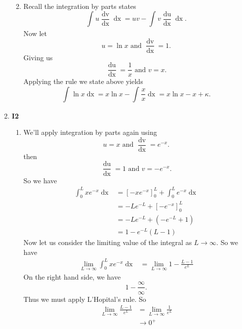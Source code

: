 \documentclass[12pt,oneside]{book}
\begin{document}
\begin{enumerate}
\begin{enumerate}
\begin{align*}
            \end{align*}
            \item Recall the integration by parts states \[
                \int_{}^{} u \frac{\mathop{\mathrm{d}v}}{\mathop{\mathrm{d}x}} \mathop{\mathrm{d}x} = uv - \int_{}^{} v \frac{\mathop{\mathrm{d}u}}{\mathop{\mathrm{d}x}} \mathop{\mathrm{d}x}  
            .\] Now let \[
                u = \ln x \text{ and } \frac{\mathop{\mathrm{d}v}}{\mathop{\mathrm{d}x}} = 1
            .\] Giving us \[
                \frac{\mathop{\mathrm{d}u}}{\mathop{\mathrm{d}x}} = \frac{1}{x} \text{ and } v = x
            .\] Applying the rule we state above yields \[
                \int_{}^{} \ln x \mathop{\mathrm{d}x} = x \ln x - \int_{}^{} \frac{x}{x} \mathop{\mathrm{d}x} = x \ln x - x + \kappa  
            .\] 
        \end{enumerate}
        \item \textbf{I2} \begin{enumerate}
            \item We'll apply integration by parts again using \[
                u = x \text{ and } \frac{\mathop{\mathrm{d}v}}{\mathop{\mathrm{d}x}} = e^{-x}
            .\] then \[
                \frac{\mathop{\mathrm{d}u}}{\mathop{\mathrm{d}x}} = 1 \text{ and } v = - e^{-x}
            .\] So we have \begin{align*}
                \int_{0}^{L} xe^{-x} \mathop{\mathrm{d}x} &= \left[ -xe^{-x} \right]_0^L + \int_{0}^{L} e^{-x} \mathop{\mathrm{d}x} \\
                &= -L e^{-L} + \left[  - e^{-x} \right]_0^L \\
                &= -L e^{-L} + \left( -e^{-L} + 1 \right) \\
                &= 1 - e^{-L} (L - 1)
            \end{align*}
            Now let us consider the limiting value of the integral as $L \to \infty$. So we have \begin{align*}
                \lim_{L \to \infty} \int_{0}^{L} xe^{-x} \mathop{\mathrm{d}x} &= \lim_{L \to \infty} 1 - \frac{L - 1}{e^L} 
            \end{align*}
            On the right hand side, we have \[
                1 - \frac{\infty}{\infty}
            .\] Thus we must apply L'Hopital's rule. So \begin{align*}
                \lim_{L \to \infty} \frac{L - 1}{e^L} &= \lim_{L \to \infty} \frac{1}{e^L} \\
                &\to 0^+
            \end{align*}

\end{enumerate}
\end{enumerate}
\end{document}

